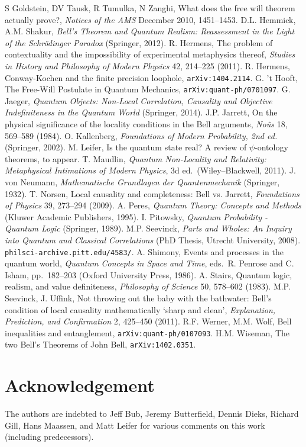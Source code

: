 \documentclass[12pt]{article}
\begin{document}
\begin{thebibliography}{99}
  S Goldstein, DV Tausk, R Tumulka, N Zanghi, What does the free will theorem actually prove?, \emph{Notices of the AMS} December 2010, 1451--1453.
 D.L. Hemmick, A.M. Shakur, \emph{Bell's Theorem and Quantum Realism:  Reassessment in the Light of the Schr\"{o}dinger Paradox}
(Springer, 2012). 
 R. Hermens, The problem of contextuality and the impossibility of experimental metaphysics thereof, \emph{Studies in History and Philosophy of Modern Physics} 42, 214--225 (2011).
 R. Hermens, Conway-Kochen and the finite precision loophole,  \texttt{arXiv:1404.2114}.
  G. 't Hooft, The Free-Will Postulate in Quantum Mechanics, \texttt{arXiv:quant-ph/0701097}.
  G. Jaeger, \emph{Quantum Objects: Non-Local Correlation, Causality and Objective Indefiniteness in the Quantum World} (Springer, 2014).
 J.P. Jarrett, On the physical significance of the locality conditions in the Bell arguments,
\emph{No\^{u}s} 18, 569--589 (1984).
 O. Kallenberg, \emph{Foundations of Modern Probability, 2nd ed.} (Springer, 2002).
 M. Leifer, Is the quantum state real? A review of $\psi$-ontology theorems, to appear.
	 T. Maudlin, \emph{Quantum Non-Locality and Relativity: Metaphysical Intimations of Modern Physics}, 3d ed.\ (Wiley--Blackwell, 2011).
	 J. von Neumann, \emph{Mathematische Grundlagen der Quantenmechanik} (Springer, 1932).
 T. Norsen, Local causality and completeness: Bell vs. Jarrett, \emph{ Foundations of Physics} 39, 273--294 (2009). 
 A. Peres, \emph{Quantum Theory: Concepts and Methods} (Kluwer Academic Publishers, 1995).
  I. Pitowsky, {\it Quantum Probability - Quantum Logic} (Springer, 1989).
 M.P. Seevinck, \emph{Parts and Wholes: An Inquiry into Quantum and Classical Correlations} (PhD Thesis, Utrecht University, 2008). \texttt{philsci-archive.pitt.edu/4583/}.
 A. Shimony, Events and processes in the quantum world, \emph{Quantum Concepts in Space and Time}, eds.\ R. Penrose and C. Isham, pp.\ 182--203 (Oxford University Press, 1986).
 A. Stairs, Quantum logic, realism, and value definiteness, \emph{Philosophy of Science} 50, 578--602 (1983).
   M.P. Seevinck, J. Uffink, Not throwing out the baby with the bathwater: Bell's condition of local causality mathematically `sharp and clean', \emph{Explanation, Prediction, and Confirmation}  2, 425--450 (2011).
   R.F. Werner,   M.M. Wolf, Bell inequalities and entanglement, \texttt{arXiv:quant-ph/0107093}.
   H.M. Wiseman, The two Bell's Theorems of John Bell, \texttt{arXiv:1402.0351}.
    \end{thebibliography}
    \section*{Acknowledgement}
The authors are indebted to Jeff Bub, Jeremy Butterfield, Dennis Dieks, Richard Gill, Hans Maassen, and Matt Leifer for various comments on this work (including  predecessors).
\end{document}
